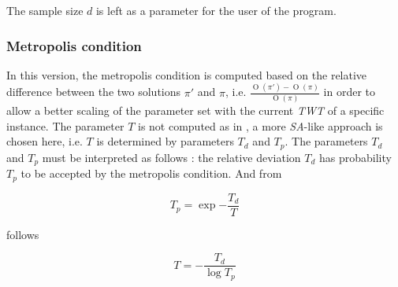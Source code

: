 The sample size $d$ is left as a parameter for the user of the program.


\subsubsection{Metropolis condition}
\label{impl:ig:metropolis}

In this version, the metropolis condition is computed based on the relative difference between the two solutions $\pi'$ and $\pi$, i.e. $\frac{\operatorname{O}(\pi') - \operatorname{O}(\pi)}{\operatorname{O}(\pi)}$ in order to allow a better scaling of the parameter set with the current \emph{TWT} of a specific instance. The parameter $T$ is not computed as in \cite{DBLP:journals/eor/RuizS08}, a more \emph{SA}-like approach is chosen here, i.e. $T$ is determined by parameters $T_d$ and $T_p$. The parameters $T_d$ and $T_p$ must be interpreted as follows : the relative deviation $T_d$ has probability $T_p$ to be accepted by the metropolis condition. And from

$$ T_p = \exp{-\frac{T_d}{T}} $$

follows

$$ T = - \frac{T_d}{\log{T_p}} $$